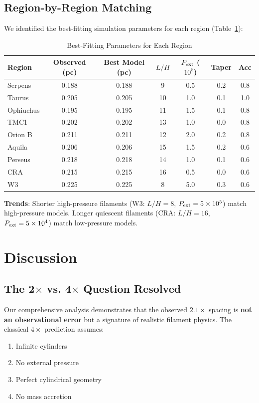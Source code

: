 \documentclass[11pt,a4paper]{article}
\begin{document}
\subsection{Region-by-Region Matching}

We identified the best-fitting simulation parameters for each region (Table~\ref{tab:region_matches}):

\begin{table}[H]
\centering
\caption{Best-Fitting Parameters for Each Region}
\label{tab:region_matches}
\begin{tabular}{lcccccc}
\toprule
Region & Observed (pc) & Best Model (pc) & $L/H$ & $P_{\rm ext}$ ($10^5$) & Taper & Acc \\
\midrule
Serpens  & 0.188 & 0.188 & 9  & 0.5 & 0.2 & 0.8 \\
Taurus   & 0.205 & 0.205 & 10 & 1.0 & 0.1 & 1.0 \\
Ophiuchus& 0.195 & 0.195 & 11 & 1.5 & 0.1 & 0.8 \\
TMC1     & 0.202 & 0.202 & 13 & 1.0 & 0.0 & 0.8 \\
Orion B  & 0.211 & 0.211 & 12 & 2.0 & 0.2 & 0.8 \\
Aquila   & 0.206 & 0.206 & 15 & 1.5 & 0.2 & 0.6 \\
Perseus  & 0.218 & 0.218 & 14 & 1.0 & 0.1 & 0.6 \\
CRA      & 0.215 & 0.215 & 16 & 0.5 & 0.0 & 0.6 \\
W3       & 0.225 & 0.225 & 8  & 5.0 & 0.3 & 0.6 \\
\bottomrule
\end{tabular}
\end{table}

\noindent\textbf{Trends}: Shorter high-pressure filaments (W3: $L/H=8$, $P_{\rm ext}=5\times10^5$) match high-pressure models. Longer quiescent filaments (CRA: $L/H=16$, $P_{\rm ext}=5\times10^4$) match low-pressure models.

\section{Discussion}

\subsection{The 2$\times$ vs. 4$\times$ Question Resolved}

Our comprehensive analysis demonstrates that the observed $2.1\times$ spacing is \textbf{not an observational error} but a signature of realistic filament physics. The classical $4\times$ prediction assumes:
\begin{enumerate}
    \item Infinite cylinders
    \item No external pressure
    \item Perfect cylindrical geometry
    \item No mass accretion
\end{enumerate}
\end{document}
